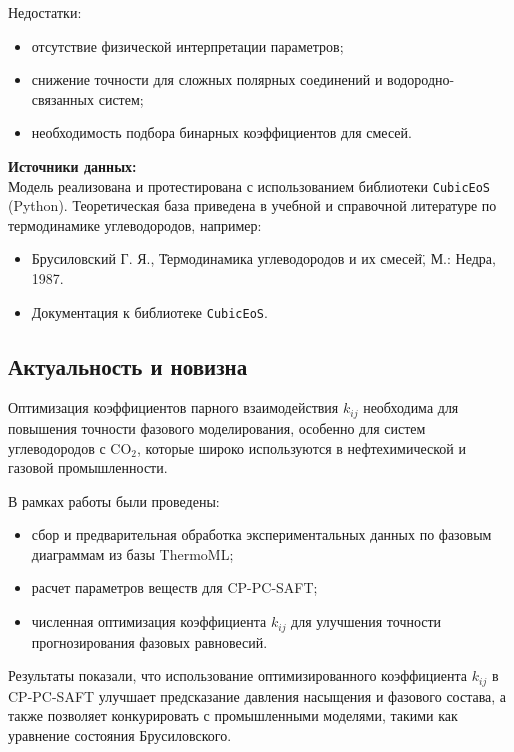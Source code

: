\documentclass[a4paper,12pt]{article}
\begin{document}
Недостатки:
\begin{itemize}
    \item отсутствие физической интерпретации параметров;
    \item снижение точности для сложных полярных соединений и водородно-связанных систем;
    \item необходимость подбора бинарных коэффициентов для смесей.
\end{itemize}

\textbf{Источники данных:} \\
Модель реализована и протестирована с использованием библиотеки \texttt{CubicEoS} (Python). Теоретическая база приведена в учебной и справочной литературе по термодинамике углеводородов, например:

\begin{itemize}
    \item Брусиловский Г. Я., \"Термодинамика углеводородов и их смесей\", М.: Недра, 1987. \cite{Brusilovskii1987}
    \item Документация к библиотеке \texttt{CubicEoS}. \cite{Pisarev2025} \cite{Zakharov2024}
\end{itemize}


\subsection{Актуальность и новизна}

Оптимизация коэффициентов парного взаимодействия \( k_{ij} \) необходима для повышения точности фазового моделирования, особенно для систем углеводородов с $\mathrm{CO}_{2}$, которые широко используются в нефтехимической и газовой промышленности.

В рамках работы были проведены:
\begin{itemize}
	\item сбор и предварительная обработка экспериментальных данных по фазовым диаграммам из базы ThermoML;
	\item расчет параметров веществ для CP-PC-SAFT;
	\item численная оптимизация коэффициента \( k_{ij} \) для улучшения точности прогнозирования фазовых равновесий.
\end{itemize}

Результаты показали, что использование оптимизированного коэффициента \( k_{ij} \) в CP-PC-SAFT улучшает предсказание давления насыщения и фазового состава, а также позволяет конкурировать с промышленными моделями, такими как уравнение состояния Брусиловского.
\end{document}
